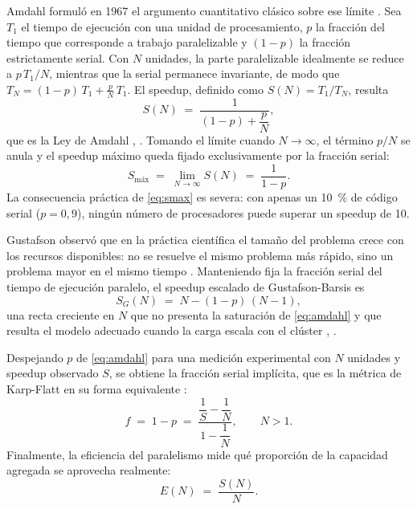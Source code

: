 \documentclass[10pt,journal]{IEEEtran}
\begin{document}
Amdahl formul\'o en 1967 el argumento cuantitativo cl\'asico sobre ese
l\'imite \cite{amdahl1967}. Sea $T_1$ el tiempo de ejecuci\'on con una unidad de
procesamiento, $p$ la fracci\'on del tiempo que corresponde a trabajo
paralelizable y $(1-p)$ la fracci\'on estrictamente serial. Con $N$ unidades, la
parte paralelizable idealmente se reduce a $p\,T_1/N$, mientras que la serial
permanece invariante, de modo que
$T_N = (1-p)\,T_1 + \frac{p}{N}\,T_1$. El speedup, definido como
$S(N) = T_1 / T_N$, resulta
\begin{equation}
S(N) \;=\; \frac{1}{(1-p) + \dfrac{p}{N}},
\label{eq:amdahl}
\end{equation}
que es la Ley de Amdahl \cite{amdahl1967}, \cite{karp1990}. Tomando el l\'imite
cuando $N \to \infty$, el t\'ermino $p/N$ se anula y el speedup m\'aximo queda
fijado exclusivamente por la fracci\'on serial:
\begin{equation}
S_{\text{m\'ax}} \;=\; \lim_{N \to \infty} S(N) \;=\; \frac{1}{1-p}.
\label{eq:smax}
\end{equation}
La consecuencia pr\'actica de \eqref{eq:smax} es severa: con apenas un
\SI{10}{\percent} de c\'odigo serial ($p=0{,}9$), ning\'un n\'umero de
procesadores puede superar un speedup de 10.

Gustafson observ\'o que en la pr\'actica cient\'ifica el tama\~no del problema
crece con los recursos disponibles: no se resuelve el mismo problema m\'as
r\'apido, sino un problema mayor en el mismo tiempo \cite{gustafson1988}.
Manteniendo fija la fracci\'on serial del tiempo de ejecuci\'on paralelo, el
speedup escalado de Gustafson-Barsis es
\begin{equation}
S_G(N) \;=\; N - (1-p)\,(N-1),
\label{eq:gustafson}
\end{equation}
una recta creciente en $N$ que no presenta la saturaci\'on de
\eqref{eq:amdahl} y que resulta el modelo adecuado cuando la carga escala con el
cl\'uster \cite{gustafson1988}, \cite{karp1990}.

Despejando $p$ de \eqref{eq:amdahl} para una medici\'on experimental con $N$
unidades y speedup observado $S$, se obtiene la fracci\'on serial impl\'icita,
que es la m\'etrica de Karp-Flatt en su forma equivalente \cite{karp1990}:
\begin{equation}
f \;=\; 1-p \;=\; \frac{\dfrac{1}{S} - \dfrac{1}{N}}{1 - \dfrac{1}{N}},
\qquad N > 1.
\label{eq:karpflatt}
\end{equation}
Finalmente, la eficiencia del paralelismo mide qu\'e proporci\'on de la
capacidad agregada se aprovecha realmente:
\begin{equation}
E(N) \;=\; \frac{S(N)}{N}.
\label{eq:eficiencia}
\end{equation}
\end{document}
